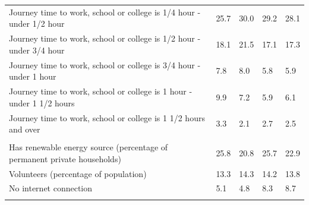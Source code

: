 \documentclass{article}
\begin{document}
\begin{table}[h]
\begin{tabular}{KTTTT}
Journey time to work, school or college is 1/4 hour - under 1/2 hour & 25.7& 30.0& 29.2& 28.1\\
Journey time to work, school or college is 1/2 hour - under 3/4 hour & 18.1& 21.5& 17.1& 17.3\\
Journey time to work, school or college is 3/4 hour - under 1 hour & 7.8& 8.0& 5.8& 5.9\\
Journey time to work, school or college is 1 hour - under 1 1/2 hours & 9.9& 7.2& 5.9& 6.1\\
Journey time to work, school or college is 1 1/2 hours and over & 3.3& 2.1& 2.7& 2.5\\
\hline
    \\ 
    \hline
Has renewable energy source (percentage of permanent private households) & 25.8& 20.8& 25.7& 22.9\\
    \hline
Volunteers (percentage of population) & 13.3& 14.3& 14.2& 13.8\\
    \hline
No internet connection& 5.1& 4.8& 8.3& 8.7\\
\hline
\end{tabular}
\end{table}
\end{document}
